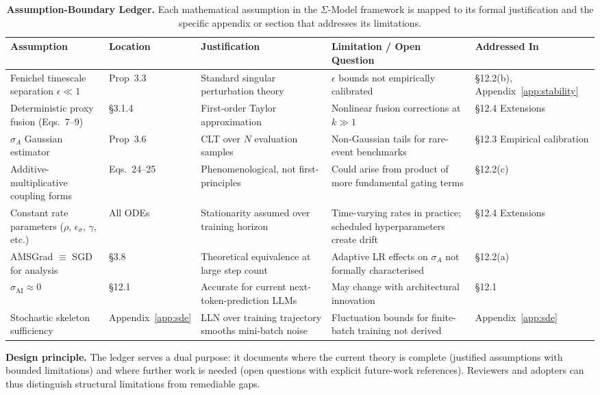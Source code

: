 \documentclass[10pt]{article}
\begin{document}
\begin{table}[htbp]
\centering
\small
\begin{tabular}{p{3.3cm} p{1.6cm} p{2.8cm} p{3.2cm} p{2.5cm}}
\toprule
\textbf{Assumption} & \textbf{Location} & \textbf{Justification} & \textbf{Limitation / Open Question} & \textbf{Addressed In} \\
\midrule
Fenichel timescale separation $\epsilon \ll 1$ & Prop~3.3 & Standard singular perturbation theory & $\epsilon$ bounds not empirically calibrated & §12.2(b), Appendix~\ref{app:stability} \\
Deterministic proxy fusion (Eqs.~7--9) & §3.1.4 & First-order Taylor approximation & Nonlinear fusion corrections at $k \gg 1$ & §12.4 Extensions \\
$\hat{\sigma}_A$ Gaussian estimator & Prop~3.6 & CLT over $N$ evaluation samples & Non-Gaussian tails for rare-event benchmarks & §12.3 Empirical calibration \\
Additive-multiplicative coupling forms & Eqs.~24--25 & Phenomenological, not first-principles & Could arise from product of more fundamental gating terms & §12.2(c) \\
Constant rate parameters ($\rho$, $\epsilon_\sigma$, $\gamma$, etc.) & All ODEs & Stationarity assumed over training horizon & Time-varying rates in practice; scheduled hyperparameters create drift & §12.4 Extensions \\
AMSGrad $\equiv$ SGD for analysis & §3.8 & Theoretical equivalence at large step count & Adaptive LR effects on $\sigma_A$ not formally characterised & §12.2(a) \\
$\sigma_{\text{AI}} \approx 0$ & §12.1 & Accurate for current next-token-prediction LLMs & May change with architectural innovation & §12.1 \\
Stochastic skeleton sufficiency & Appendix~\ref{app:sde} & LLN over training trajectory smooths mini-batch noise & Fluctuation bounds for finite-batch training not derived & Appendix~\ref{app:sde} \\
\bottomrule
\end{tabular}
\caption{\textbf{Assumption-Boundary Ledger.} Each mathematical assumption in the $\Sigma$-Model framework is mapped to its formal justification and the specific appendix or section that addresses its limitations.}\label{tab:assumptions}
\end{table}

\noindent\textbf{Design principle.}
The ledger serves a dual purpose: it documents where the current theory is
complete (justified assumptions with bounded limitations) and where
further work is needed (open questions with explicit future-work
references). Reviewers and adopters can thus distinguish structural
limitations from remediable gaps.
\end{document}
